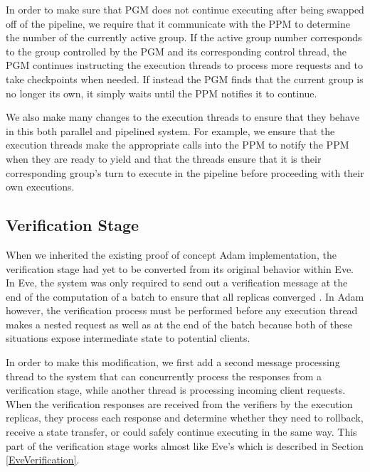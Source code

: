 \documentclass[11pt, oneside]{report}
\begin{document}
In order to make sure that PGM does not continue executing after being swapped off of the pipeline, we require that it communicate with the PPM to determine the number of the currently active group. 
If the active group number corresponds to the group controlled by the PGM and its corresponding control thread, the PGM continues instructing the execution threads to process more requests and to take checkpoints when needed. 
If instead the PGM finds that the current group is no longer its own, it simply waits until the PPM notifies it to continue.

We also make many changes to the execution threads to ensure that they behave in this both parallel and pipelined system.
For example, we ensure that the execution threads make the appropriate calls into the PPM to notify the PPM when they are ready to yield and that the threads ensure that it is their corresponding group's turn to execute in the pipeline before proceeding with their own executions.

\subsection{Verification Stage}\label{Verification}

When we inherited the existing proof of concept Adam implementation, the verification stage had yet to be converted from its original behavior within Eve.
In Eve, the system was only required to send out a verification message at the end of the computation of a batch to ensure that all replicas converged \cite{eve}.
In Adam however, the verification process must be performed before any execution thread makes a nested request as well as at the end of the batch because both of these situations expose intermediate state to potential clients.


In order to make this modification, we first add a second message processing thread to the system that can concurrently process the responses from a verification stage, while another thread is processing incoming client requests.
When the verification responses are received from the verifiers by the execution replicas, they process each response and determine whether they need to rollback, receive a state transfer, or could safely continue executing in the same way. 
This part of the verification stage works almost like Eve's which is described in Section \ref{EveVerification}.
\end{document}
